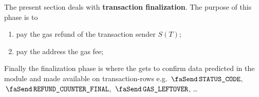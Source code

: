 The present section deals with \textbf{transaction finalization}.
The purpose of this phase is to
\begin{enumerate}
	\item pay the gas refund of the transaction sender $S(T)$;
	\item pay the  address the gas fee;
\end{enumerate}
Finally the finalization phase is where the \hubMod{} gets to confirm data predicted in the \userTxnDataMod{} module and made available on transaction-rows e.g.
$\txStatusCode$,
$\txFinalRefundCounter$,
$\txLeftoverGas$,
\dots{}
